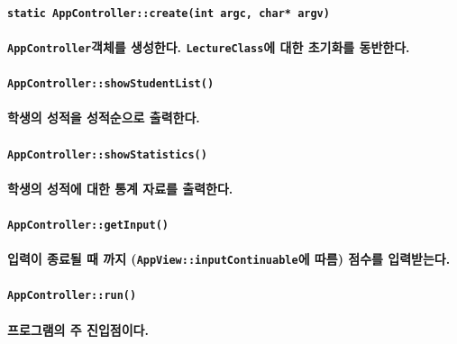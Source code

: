 \documentclass[UTF8]{report}
\begin{document}
            \paragraph{\texttt{static AppController::create(int argc, char* argv)}}
            \paragraph{%
                \normalfont \texttt{AppController}객체를 생성한다. \texttt{LectureClass}에 대한 초기화를 동반한다.
            }

            \paragraph{\texttt{AppController::showStudentList()}}
            \paragraph{%
                \normalfont 학생의 성적을 성적순으로 출력한다.
            }

            \paragraph{\texttt{AppController::showStatistics()}}
            \paragraph{%
                \normalfont 학생의 성적에 대한 통계 자료를 출력한다.
            }

            \paragraph{\texttt{AppController::getInput()}}
            \paragraph{%
                \normalfont 입력이 종료될 때 까지 (\texttt{AppView::inputContinuable}에 따름) 점수를 입력받는다. 
            }

            \paragraph{\texttt{AppController::run()}}
            \paragraph{%
                \normalfont 프로그램의 주 진입점이다.
            }
\end{document}
